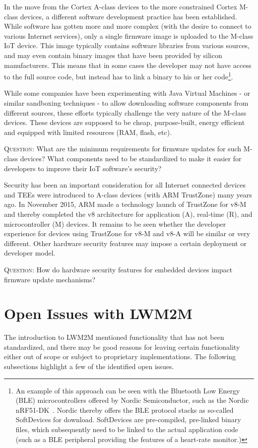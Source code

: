 \documentclass[peerreview, a4paper, 7pt]{IEEEtran}
\begin{document}
In the move from the Cortex A-class devices to the more constrained Cortex M-class devices, a different software development practice has been established. While software has gotten more and more complex (with the desire to connect to various Internet services), only a single firmware image is uploaded to the M-class IoT device. This image typically contains software libraries from various sources, and may even contain binary images that have been provided by silicon manufacturers. This means that in some cases the developer may not have access to the full source code, but instead has to link a binary to his or her code\footnote{An example of this approach can be seen with the Bluetooth Low Energy (BLE) microcontrollers offered by Nordic Semiconductor, such as the Nordic nRF51-DK~\cite{nRF51-DK}. Nordic thereby offers the BLE protocol stacks as so-called SoftDevices for download. SoftDevices are pre-compiled, pre-linked binary files, which subsequently need to be linked to the actual application code (such as a BLE peripheral providing the features of a heart-rate monitor.)}.

While some companies have been experimenting with Java Virtual Machines - or similar sandboxing techniques - to allow downloading software components from different sources, these efforts typically challenge the very nature of the M-class devices. These devices are supposed to be cheap, purpose-built, energy efficient and equipped with limited resources (RAM, flash, etc).  

\textsc{Question}: What are the minimum requirements for firmware updates for such M-class devices? What components need to be standardized to make it easier for developers to improve their IoT software's security?

Security has been an important consideration for all Internet connected devices and TEEs were introduced to A-class devices (with ARM TrustZone) many years ago. In November 2015, ARM made a technology launch of TrustZone for v8-M~\cite{Trustzone} and thereby completed the v8 architecture for application (A), real-time (R), and microcontroller (M) devices. It remains to be seen whether the developer experience for devices using TrustZone for v8-M and v8-A will be similar or very different. Other hardware security features may impose a certain deployment or developer model.

\textsc{Question}: How do hardware security features for embedded devices impact firmware update mechanisms?

\section{Open Issues with LWM2M}
\label{open-issues}
The introduction to LWM2M mentioned functionality that has not been standardized, and there may be good reasons for leaving certain functionality either out of scope or subject to proprietary implementations. The following subsections highlight a few of the identified open issues. 
\end{document}
